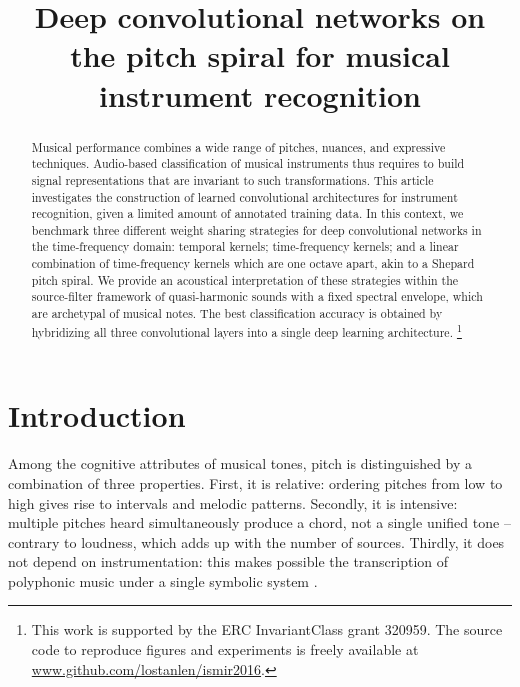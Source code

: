 \documentclass{article}
\title{Deep convolutional networks on the pitch spiral for musical instrument recognition}
\newcommand\blfootnote[1]{%
  \begingroup
  \renewcommand\thefootnote{}\footnote{#1}%
  \addtocounter{footnote}{-1}%
  \endgroup
}
\begin{document}
%
\maketitle
%
\begin{abstract}
Musical performance combines a wide range of pitches, nuances,
and expressive techniques.
Audio-based classification of musical instruments thus requires to
build signal representations that are invariant to such transformations.
This article investigates the construction
of learned convolutional architectures for instrument recognition,
given a limited amount of annotated training data.
In this context, we benchmark three different weight sharing
strategies for deep convolutional networks in the
time-frequency domain: temporal kernels;
time-frequency kernels;
and a linear combination of time-frequency
kernels which are one octave apart, akin to a Shepard pitch spiral.
We provide an acoustical interpretation of these strategies
within the source-filter framework of quasi-harmonic sounds with
a fixed spectral envelope, which are archetypal of musical notes.
The best classification accuracy is obtained by hybridizing all three
convolutional layers into a single deep learning architecture.
\blfootnote{This work is supported by the ERC InvariantClass grant 320959.
The source code to reproduce figures and experiments is freely available at
\url{www.github.com/lostanlen/ismir2016}.}

\end{abstract}

\section{Introduction}\label{sec:introduction}
Among the cognitive attributes of musical tones, pitch is distinguished
by a combination of three properties.
First, it is relative: ordering pitches from low to high gives rise to
intervals and melodic patterns.
Secondly, it is intensive: multiple pitches heard simultaneously produce
a chord, not a single unified tone -- contrary to loudness, which adds
up with the number of sources.
Thirdly, it does not depend on instrumentation: this makes possible
the transcription of polyphonic music under a single symbolic system
\cite{deCheveigne2005}.
\end{document}

